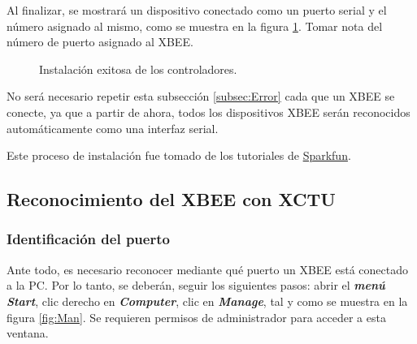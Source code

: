 Al finalizar, se mostrará un dispositivo conectado como un puerto serial y el número asignado al mismo, como se muestra en la figura \ref{fig:Success}. Tomar nota del número de puerto asignado al XBEE.

\begin{figure}[H] %
\caption{Instalación exitosa de los controladores.}
\label{fig:Success}
\end{figure}

No será necesario repetir esta subsección \ref{subsec:Error} cada que un XBEE se conecte, ya que a partir de ahora, todos los dispositivos XBEE serán reconocidos automáticamente como una interfaz serial.

Este proceso de instalación fue tomado de los tutoriales de \href{https://learn.sparkfun.com/tutorials/how-to-install-ftdi-drivers/all}{Sparkfun}\footnotemark.


\subsection{Reconocimiento del XBEE con XCTU}\label{subsec:Fine}
\subsubsection{Identificación del puerto}\label{subsubsec:Iden}
Ante todo, es necesario reconocer mediante qué puerto un XBEE está conectado a la PC. Por lo tanto, se deberán, seguir los siguientes pasos: abrir el \textit{\textbf{menú Start}}, clic derecho en \textit{\textbf{Computer}}, clic en \textit{\textbf{Manage}}, tal y como se muestra en la figura \ref{fig:Man}. Se requieren permisos de administrador para acceder a esta ventana.

